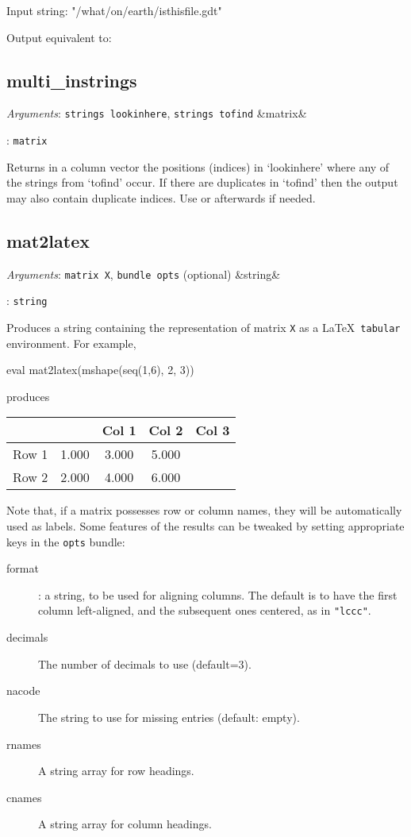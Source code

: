 \documentclass[11pt,english]{article}
\newcommand{\ArgRet}[2]{%
  {\it Arguments}: {#1}%
  \ifx&#2&%
  \else
  \par\smallskip\noindent {\it Return type}: \texttt{#2}
  \fi%
  \par\medskip\par%
  }
\begin{document}
Input string: "/what/on/earth/isthisfile.gdt"

Output equivalent to:


\subsection{multi\_instrings}

\ArgRet{\texttt{strings lookinhere}, \texttt{strings tofind}}{matrix}

Returns in a column vector the positions (indices) in `lookinhere' where any of the
strings from `tofind' occur. If there are duplicates in `tofind' then the output
may also contain duplicate indices. Use  or  afterwards if needed.

\subsection{mat2latex}

\ArgRet{\texttt{matrix X}, \texttt{bundle opts} (optional)}{string}

Produces a string containing the representation of matrix \texttt{X}
as a \LaTeX\ \texttt{tabular} environment. For example,
\begin{code}
eval mat2latex(mshape(seq(1,6), 2, 3))
\end{code}
produces
\begin{code}
\begin{tabular}{lccc}
\hline
 &	  &	 Col 1  &	 Col 2  &	 Col 3 \\ \hline
Row 1 & 1.000	 & 3.000	 & 5.000 \\
Row 2 & 2.000	 & 4.000	 & 6.000 \\
\hline
\end{tabular}
\end{code}
Note that, if a matrix possesses row or column names, they will be
automatically used as labels. Some features of the results can be
tweaked by setting appropriate keys in the \texttt{opts} bundle:
\begin{description}
\item[format]: a string, to be used for aligning columns. The default
  is to have the first column left-aligned, and the subsequent ones
  centered, as in \texttt{"lccc"}.
\item[decimals] The number of decimals to use (default=3).
\item[nacode] The string to use for missing entries (default: empty).
\item[rnames] A string array for row headings.
\item[cnames] A string array for column headings.
\end{description}
\end{document}
